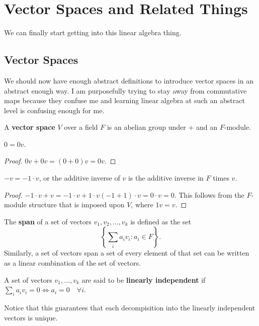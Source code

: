 \section{Vector Spaces and Related Things}
We can finally start getting into this linear algebra thing.
\subsection{Vector Spaces}
We should now have enough abstract definitions to introduce vector
spaces in an abstract enough way. I am purposefully trying to stay away
from commutative maps because they confuse me and learning linear
algebra at such an abstract level is confusing enough for me.

\begin{df}
A \textbf{vector space} $V$ over a field $F$ is an abelian group under
$+$ and an $F$-module.
\end{df}

\begin{prop}
$0 = 0v$.
\end{prop}

\begin{proof}
$0v + 0v = (0 + 0) v = 0v$.
\end{proof}

\begin{prop}
$-v = -1 \cdot v$, or the additive inverse of $v$ is the additive
inverse in $F$ times $v$.
\end{prop}

\begin{proof}
$-1 \cdot v + v = -1 \cdot v + 1 \cdot v (-1 + 1) \cdot v = 0 \cdot v =
0$. This follows from the $F$-module structure that is imposed upon $V$,
where $1v = v$.
\end{proof}

\begin{df}
The \textbf{span} of a set of vectors $v_1, v_2, \dots, v_k$ is defined
as the set
\[ \left\lbrace \sum_i a_i v_i : a_i \in F \right\rbrace. \]
Similarly, a set of vectors span a set of every element of that set can
be written as a linear combination of the set of vectors.
\end{df}

\begin{df}
A set of vectors $v_1, \dots, v_k$ are said to be \textbf{linearly
independent} if $\sum_i a_i v_i = 0 \Leftrightarrow a_i = 0 \quad
\forall i$.
\end{df}

\begin{rem}
Notice that this guarantees that each decompisition into the linearly
independent vectors is unique.
\end{rem}

